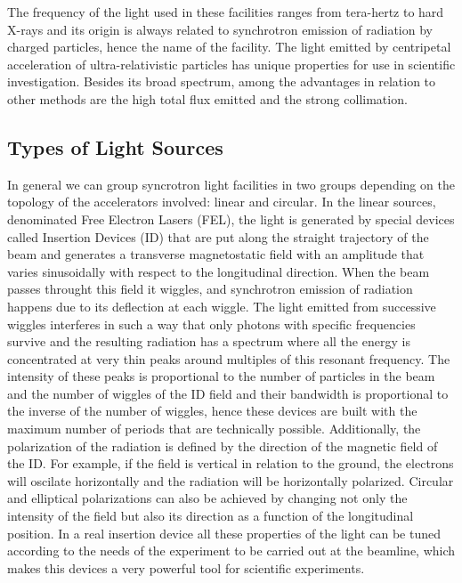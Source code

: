 \documentclass[
	12pt,				%
	openright,			%
	oneside,			%
	a4paper,		%
	chapter=TITLE,		%
	section=TITLE,		%
    brazil,				%
	english,			%
	sumario=tradicional,
	]{abntex2}
\begin{document}
  The frequency of the light used in these facilities ranges from tera-hertz to hard X-rays and its origin is always related to synchrotron emission of radiation by charged particles, hence the name of the facility. The light emitted by centripetal acceleration of ultra-relativistic particles has unique properties for use in scientific investigation. Besides its broad spectrum, among the advantages in relation to other methods are the high total flux emitted and the strong collimation.

    \subsection{Types of Light Sources}

    In general we can group syncrotron light facilities in two groups depending on the topology of the accelerators involved: linear and circular. In the linear sources, denominated Free Electron Lasers (FEL), the light is generated by special devices called Insertion Devices (ID) that are put along the straight trajectory of the beam and generates a transverse magnetostatic field with an amplitude that varies sinusoidally with respect to the longitudinal direction. When the beam passes throught this field it wiggles, and synchrotron emission of radiation happens due to its deflection at each wiggle. The light emitted from successive wiggles interferes in such a way that only photons with specific frequencies survive and the resulting radiation has a spectrum where all the energy is concentrated at very thin peaks around multiples of this resonant frequency. The intensity of these peaks is proportional to the number of particles in the beam and the number of wiggles of the ID field and their bandwidth is proportional to the inverse of the number of wiggles, hence these devices are built with the maximum number of periods that are technically possible. Additionally, the polarization of the radiation is defined by the direction of the magnetic field of the ID. For example, if the field is vertical in relation to the ground, the electrons will oscilate horizontally and the radiation will be horizontally polarized. Circular and elliptical polarizations can also be achieved by changing not only the intensity of the field but also its direction as a function of the longitudinal position. In a real insertion device all these properties of the light can be tuned according to the needs of the experiment to be carried out at the beamline, which makes this devices a very powerful tool for scientific experiments.
\end{document}
